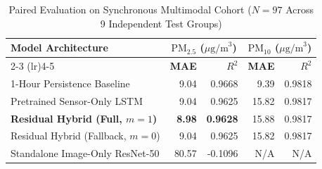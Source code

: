 \begin{table}[t]
\caption{Paired Evaluation on Synchronous Multimodal Cohort ($N=97$ Across 9 Independent Test Groups)}
\label{tab:paired_comparison}
\centering
\small
\begin{tabular}{lrrrr}
\toprule
\textbf{Model Architecture} & \multicolumn{2}{c}{\textbf{$\text{PM}_{2.5}$ ($\mu\text{g/m}^3$)}} & \multicolumn{2}{c}{\textbf{$\text{PM}_{10}$ ($\mu\text{g/m}^3$)}} \\
\cmidrule(lr){2-3} \cmidrule(lr){4-5}
& \textbf{MAE} & \textbf{$R^2$} & \textbf{MAE} & \textbf{$R^2$} \\
\midrule
1-Hour Persistence Baseline & 9.04 & 0.9668 & 9.39 & 0.9818 \\
Pretrained Sensor-Only LSTM & 9.04 & 0.9625 & 15.82 & 0.9817 \\
\textbf{Residual Hybrid (Full, $m=1$)} & \textbf{8.98} & \textbf{0.9628} & 15.88 & 0.9817 \\
Residual Hybrid (Fallback, $m=0$) & 9.04 & 0.9625 & 15.82 & 0.9817 \\
Standalone Image-Only ResNet-50 & 80.57 & -0.1096 & N/A & N/A \\
\bottomrule
\end{tabular}
\end{table}
